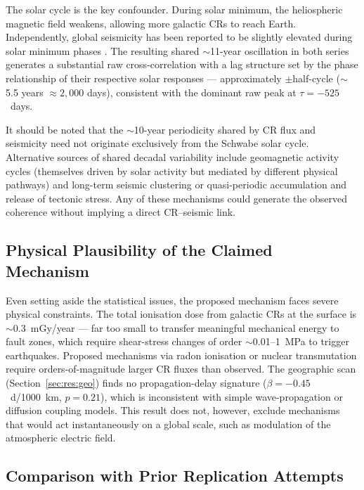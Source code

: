 \documentclass[12pt,a4paper]{article}
\begin{document}
The solar cycle is the key confounder.
During solar minimum, the heliospheric magnetic field weakens, allowing more
galactic CRs to reach Earth.
Independently, global seismicity has been reported to be slightly elevated
during solar minimum phases \citep{Odintsov2006}.
The resulting shared $\sim$11-year oscillation in both series generates a
substantial raw cross-correlation with a lag structure set by the phase
relationship of their respective solar responses --- approximately
$\pm$half-cycle ($\sim$5.5 years $\approx 2{,}000$ days), consistent with
the dominant raw peak at $\tau = -525$~days.

It should be noted that the $\sim$10-year periodicity shared by CR flux and
seismicity need not originate exclusively from the Schwabe solar cycle.
Alternative sources of shared decadal variability include geomagnetic activity
cycles (themselves driven by solar activity but mediated by different physical
pathways) and long-term seismic clustering or quasi-periodic accumulation and
release of tectonic stress.
Any of these mechanisms could generate the observed coherence without implying
a direct CR--seismic link.

\subsection{Physical Plausibility of the Claimed Mechanism}

Even setting aside the statistical issues, the proposed mechanism faces severe
physical constraints.
The total ionisation dose from galactic CRs at the surface is
$\sim 0.3$~mGy/year \citep{Aplin2005} --- far too small to
transfer meaningful mechanical energy to fault zones, which require shear-stress
changes of order $\sim$0.01--1~MPa to trigger earthquakes.
Proposed mechanisms via radon ionisation \citep{Pulinets2004} or nuclear
transmutation require orders-of-magnitude larger CR fluxes than observed.
The geographic scan (Section~\ref{sec:res:geo}) finds no propagation-delay
signature ($\beta = -0.45$~d/1000~km, $p = 0.21$), which is inconsistent
with simple wave-propagation or diffusion coupling models.
This result does not, however, exclude mechanisms that would act instantaneously
on a global scale, such as modulation of the atmospheric electric field.

\subsection{Comparison with Prior Replication Attempts}
\end{document}
